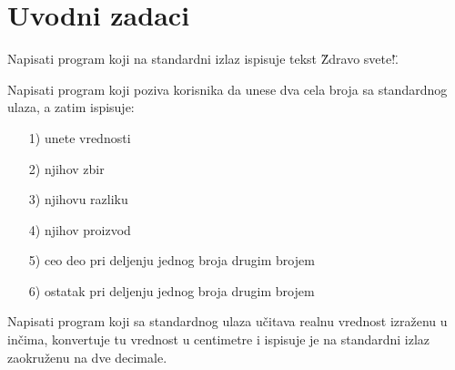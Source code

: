 \renewcommand{\chaptermark}[1]{\markboth{\thechapter\ #1}{#1}}
\renewcommand{\sectionmark}[1]{\markright{\thesection\ #1}}


\chapter{Uvodni zadaci}


\setcounter{page}{1}



\begin{Exercise}[label=v1.1_01] 
Napisati program koji na standardni izlaz ispisuje tekst \"Zdravo svete!\".
\end{Exercise}
\begin{Answer}[ref=v1.1_01]
\end{Answer}

\begin{Exercise}[label=v1.1_02] 
Napisati program koji poziva korisnika da unese dva cela broja sa standardnog ulaza,
a zatim ispisuje:
\begin{itemize}
\item[1)] unete vrednosti
\item[2)] njihov zbir
\item[3)] njihovu razliku
\item[4)] njihov proizvod
\item[5)] ceo deo pri deljenju jednog broja drugim brojem
\item[6)] ostatak pri deljenju jednog broja drugim brojem
\end{itemize}
\end{Exercise}
\begin{Answer}[ref=v1.1_02]
\end{Answer}

\begin{Exercise}[label=v1.1_03] 
Napisati program koji sa standardnog ulaza učitava realnu vrednost izraženu
   u inčima, konvertuje tu vrednost u centimetre i ispisuje je na standardni izlaz
   zaokruženu na dve decimale.
\end{Exercise}
\begin{Answer}[ref=v1.1_03]
\end{Answer}

